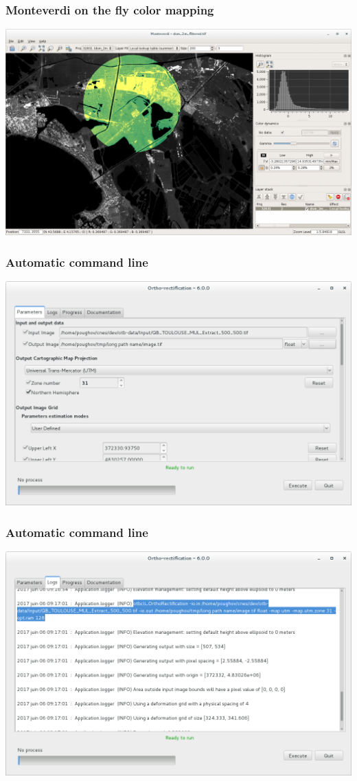 \documentclass[smaller]{beamer}
\begin{document}
\begin{frame}
\frametitle{Monteverdi on the fly color mapping}
\includegraphics[width=1\textwidth]{images/monteverdi-colormapping2.png}
\end{frame}

\begin{frame}
\frametitle{Automatic command line}
\includegraphics[width=1\textwidth]{images/automatic_command_line1.png}
\end{frame}

\begin{frame}
\frametitle{Automatic command line}
\includegraphics[width=1\textwidth]{images/automatic_command_line2.png}
\end{frame}
\end{document}
